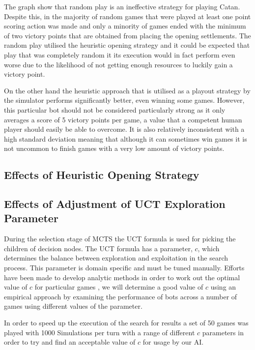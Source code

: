 \documentclass[]{article}
\begin{document}
\par The graph show that random play is an ineffective strategy for playing Catan. Despite this, in the majority of random games that were played at least one point scoring action was made and only a minority of games ended with the minimum of two victory points that are obtained from placing the opening settlements. The random play utilised the heuristic opening strategy and it could be expected that play that was completely random it its execution would in fact perform even worse due to the likelihood of not getting enough resources to luckily gain a victory point.

\par On the other hand the heuristic approach that is utilised as a playout strategy by the simulator performs significantly better, even winning some games. However, this particular bot should not be considered particularly strong as it only averages a score of 5 victory points per game, a value that a competent human player should easily be able to overcome. It is also relatively inconsistent with a high standard deviation meaning that although it can sometimes win games it is not uncommon to finish games with a very low amount of victory points. 

\subsection{Effects of Heuristic Opening Strategy}



\subsection{Effects of Adjustment of UCT Exploration Parameter}

During the selection stage of MCTS the UCT formula is used for picking the children of decision nodes. The UCT formula has a parameter, $c$, which determines the balance between exploration and exploitation in the search process. This parameter is domain specific and must be tuned manually. Efforts have been made to develop analytic methods in order to work out the optimal value of $c$ for particular games \autocite{chaslot2008cross, kozelek2009methods}, we will determine a good value of $c$ using an empirical approach by examining the performance of bots across a number of games using different values of the parameter.

\par In order to speed up the execution of the search for results a set of 50 games was played with 1000 Simulations per turn with a range of different $c$ parameters in order to try and find an acceptable value of $c$ for usage by our AI.
\end{document}

